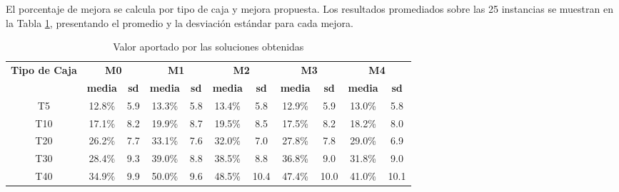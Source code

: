 El porcentaje de mejora se calcula por tipo de caja y mejora propuesta. Los resultados promediados sobre las 25 instancias se muestran en la Tabla \ref{tab:valor_aportado}, presentando el promedio y la desviación estándar para cada mejora.

\begin{table}[H]
    \centering
    \caption{Valor aportado por las soluciones obtenidas}
    \label{tab:valor_aportado}
    \begin{tabular}{|c|c|c|c|c|c|c|c|c|c|c|}
        \hline
        \multirow{2}{*}{\textbf{Tipo de Caja}} & \multicolumn{2}{c|}{\textbf{M0}} & \multicolumn{2}{c|}{\textbf{M1}} & \multicolumn{2}{c|}{\textbf{M2}} & \multicolumn{2}{c|}{\textbf{M3}} & \multicolumn{2}{c|}{\textbf{M4}}                                                                             \\ \cline{2-11}
                                               & \textbf{media}                   & \textbf{sd}                      & \textbf{media}                   & \textbf{sd}                      & \textbf{media}                   & \textbf{sd} & \textbf{media} & \textbf{sd} & \textbf{media} & \textbf{sd} \\ \hline
        T5                                     & 12.8\%                           & 5.9                              & 13.3\%                           & 5.8                              & 13.4\%                           & 5.8         & 12.9\%         & 5.9         & 13.0\%         & 5.8         \\ \hline
        T10                                    & 17.1\%                           & 8.2                              & 19.9\%                           & 8.7                              & 19.5\%                           & 8.5         & 17.5\%         & 8.2         & 18.2\%         & 8.0         \\ \hline
        T20                                    & 26.2\%                           & 7.7                              & 33.1\%                           & 7.6                              & 32.0\%                           & 7.0         & 27.8\%         & 7.8         & 29.0\%         & 6.9         \\ \hline
        T30                                    & 28.4\%                           & 9.3                              & 39.0\%                           & 8.8                              & 38.5\%                           & 8.8         & 36.8\%         & 9.0         & 31.8\%         & 9.0         \\ \hline
        T40                                    & 34.9\%                           & 9.9                              & 50.0\%                           & 9.6                              & 48.5\%                           & 10.4        & 47.4\%         & 10.0        & 41.0\%         & 10.1        \\ \hline
    \end{tabular}
\end{table}


